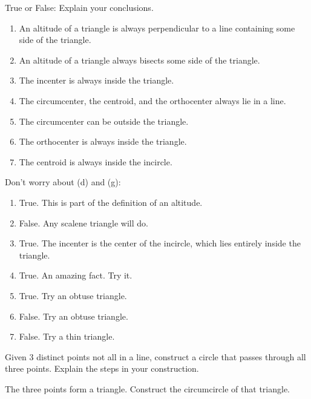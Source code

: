 \documentclass[nooutcomes]{ximera}
\begin{document}
\begin{problem}
True or False: Explain your conclusions.
\begin{enumerate}
\item An altitude of a triangle is always perpendicular to a line
  containing some side of the triangle.
\item An altitude of a triangle always bisects some side of the
  triangle.
\item The incenter is always inside the triangle.
\item The circumcenter, the centroid, and the orthocenter always lie in a line.
\item The circumcenter can be outside the triangle.
\item The orthocenter is always inside the triangle.
\item The centroid is always inside the incircle.
\end{enumerate}
\begin{freeResponse}
\begin{hint}
Don't worry about (d) and (g):
\begin{enumerate}
\item True.  This is part of the definition of an altitude.  %
\item False.  Any scalene triangle will do.  %
\item True.  The incenter is the center of the incircle, which lies entirely inside the triangle.  %
\item True.  An amazing fact.  Try it.  %
\item True.  Try an obtuse triangle.  %
\item False.  Try an obtuse triangle.  %
\item False.  Try a thin triangle.  %
\end{enumerate}
\end{hint}
\end{freeResponse}
\end{problem}

\begin{problem}
Given 3 distinct points not all in a line, construct a circle
  that passes through all three points. Explain the steps in your
  construction.
\begin{freeResponse}
\begin{hint}
The three points form a triangle.  Construct the circumcircle of that triangle.  
\end{hint}
\end{freeResponse}
\end{problem}
\end{document}
